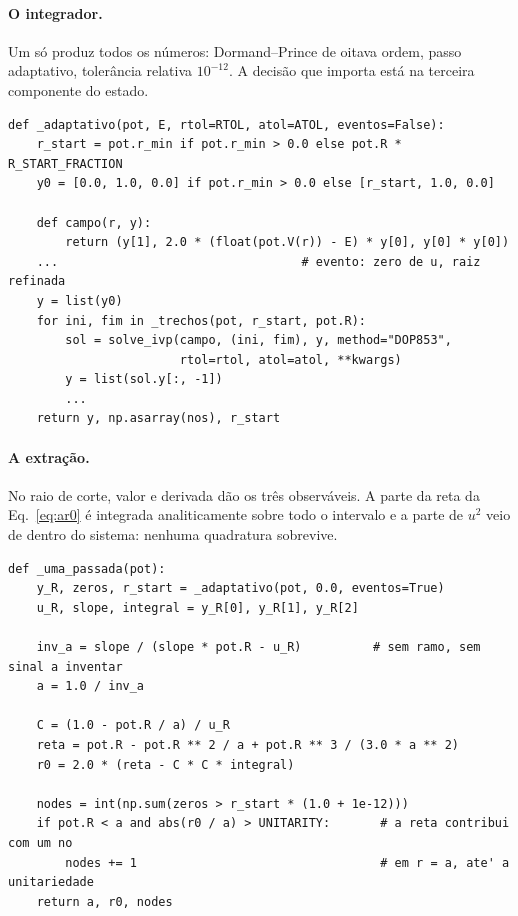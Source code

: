 \documentclass[11pt,a4paper]{article}
\newcommand{\cod}[1]{\texttt{\small #1}}
\begin{document}
\paragraph{O integrador.} Um só produz todos os números: Dormand--Prince de
oitava ordem, passo adaptativo, tolerância relativa $10^{-12}$. A decisão que
importa está na terceira componente do estado.

\begin{lstlisting}[caption={\cod{lab.py} --- o estado é $y=(u,u',\int u^2dr)$.
Carregar a integral da Eq.~\eqref{eq:ar0} \emph{dentro} do sistema faz com que
ela seja produzida pelo mesmo controle de erro que produz a função de onda, em
vez de por quadratura aplicada por cima: não resta malha para convergir. Os nós
saem por detecção de evento, e a integração é feita por trechos porque um passo
adaptativo que atravessa a descontinuidade do poço quadrado colapsa.}]
def _adaptativo(pot, E, rtol=RTOL, atol=ATOL, eventos=False):
    r_start = pot.r_min if pot.r_min > 0.0 else pot.R * R_START_FRACTION
    y0 = [0.0, 1.0, 0.0] if pot.r_min > 0.0 else [r_start, 1.0, 0.0]

    def campo(r, y):
        return (y[1], 2.0 * (float(pot.V(r)) - E) * y[0], y[0] * y[0])
    ...                                  # evento: zero de u, raiz refinada
    y = list(y0)
    for ini, fim in _trechos(pot, r_start, pot.R):
        sol = solve_ivp(campo, (ini, fim), y, method="DOP853",
                        rtol=rtol, atol=atol, **kwargs)
        y = list(sol.y[:, -1])
        ...
    return y, np.asarray(nos), r_start
\end{lstlisting}

\paragraph{A extração.} No raio de corte, valor e derivada dão os três
observáveis. A parte da reta da Eq.~\eqref{eq:ar0} é integrada analiticamente
sobre todo o intervalo e a parte de $u^2$ veio de dentro do sistema: nenhuma
quadratura sobrevive.

\begin{lstlisting}[caption={\cod{lab.py} --- perseguir $1/a$ e não $a$ percorre
todo o código: $a$ tem polos na ressonância, $1/a$ passa por zero.}]
def _uma_passada(pot):
    y_R, zeros, r_start = _adaptativo(pot, 0.0, eventos=True)
    u_R, slope, integral = y_R[0], y_R[1], y_R[2]

    inv_a = slope / (slope * pot.R - u_R)          # sem ramo, sem sinal a inventar
    a = 1.0 / inv_a

    C = (1.0 - pot.R / a) / u_R
    reta = pot.R - pot.R ** 2 / a + pot.R ** 3 / (3.0 * a ** 2)
    r0 = 2.0 * (reta - C * C * integral)

    nodes = int(np.sum(zeros > r_start * (1.0 + 1e-12)))
    if pot.R < a and abs(r0 / a) > UNITARITY:       # a reta contribui com um no
        nodes += 1                                  # em r = a, ate' a unitariedade
    return a, r0, nodes
\end{lstlisting}
\end{document}
